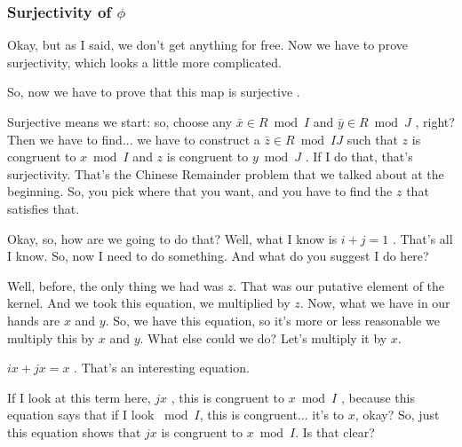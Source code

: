 \begin{proofWrapper}
\subsubsection{Surjectivity of \texorpdfstring{$\phi$}{phi}}

\begin{speech}[00:09:25 - 00:11:15]
Okay, but as I said, we don't get anything for free. Now we have to prove surjectivity, which looks a little more complicated.

So, now we have to prove that this map is surjective .

Surjective means we start: so, choose any $\bar{x} \in R \bmod I$ and $\bar{y} \in R \bmod J$ , right? Then we have to find... we have to construct a $\bar{z} \in R \bmod IJ$ such that  $z$ is congruent to $x \bmod I$ and $z$ is congruent to $y \bmod J$ . If I do that, that's surjectivity. That's the Chinese Remainder problem that we talked about at the beginning. So, you pick where that you want, and you have to find the $z$ that satisfies that.

Okay, so, how are we going to do that? Well, what I know is $i + j = 1$ . That's all I know. So, now I need to do something. And what do you suggest I do here?

Well, before, the only thing we had was $z$. That was our putative element of the kernel. And we took this equation, we multiplied by $z$. Now, what we have in our hands are $x$ and $y$. So, we have this equation, so it's more or less reasonable we multiply this by $x$ and $y$. What else could we do? Let's multiply it by $x$.
\end{speech}

\begin{speech}[00:11:15 - 00:12:57]
$ix + jx = x$ . That's an interesting equation.

If I look at this term here, $jx$ , this is congruent to $x \bmod I$ , because this equation says that if I look $\bmod I$, this is congruent... it's to $x$, okay? So, just this equation shows that $jx$ is congruent to $x \bmod I$. Is that clear?


\end{speech}
\end{proofWrapper}
